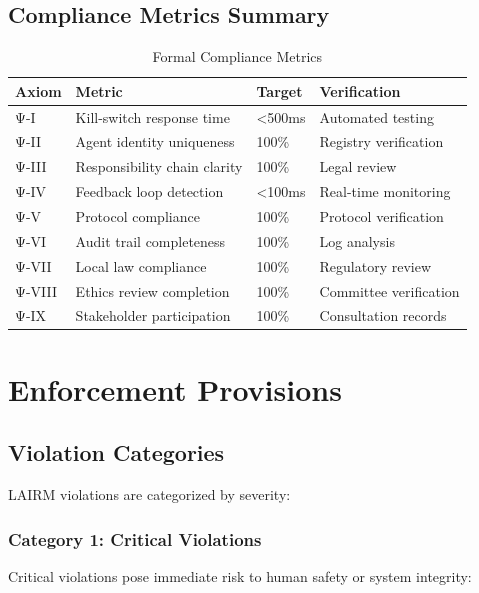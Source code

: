 \documentclass[12pt,a4paper,twoside,openright]{book}
\begin{document}
\section{Compliance Metrics Summary}

\begin{table}[h]
\centering
\begin{tabularx}{\textwidth}{@{}lXXX@{}}
\toprule
\textbf{Axiom} & \textbf{Metric} & \textbf{Target} & \textbf{Verification} \\
\midrule
Ψ-I & Kill-switch response time & <500ms & Automated testing \\
Ψ-II & Agent identity uniqueness & 100\% & Registry verification \\
Ψ-III & Responsibility chain clarity & 100\% & Legal review \\
Ψ-IV & Feedback loop detection & <100ms & Real-time monitoring \\
Ψ-V & Protocol compliance & 100\% & Protocol verification \\
Ψ-VI & Audit trail completeness & 100\% & Log analysis \\
Ψ-VII & Local law compliance & 100\% & Regulatory review \\
Ψ-VIII & Ethics review completion & 100\% & Committee verification \\
Ψ-IX & Stakeholder participation & 100\% & Consultation records \\
\bottomrule
\end{tabularx}
\caption{Formal Compliance Metrics}
\label{tab:formal-metrics}
\end{table}

\chapter{Enforcement Provisions}
\label{ch:enforcement}

\section{Violation Categories}

LAIRM violations are categorized by severity:

\subsection{Category 1: Critical Violations}

Critical violations pose immediate risk to human safety or system integrity:
\end{document}
